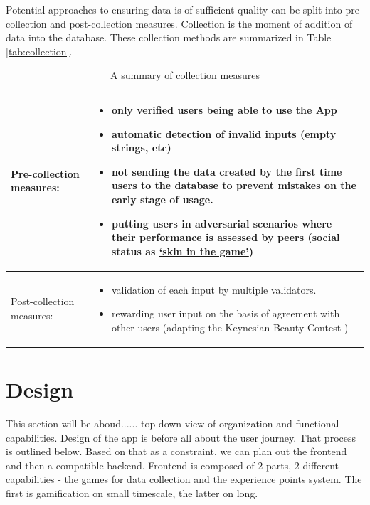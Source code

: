 \documentclass{report}
\begin{document}
Potential approaches to ensuring data is of sufficient quality can be split into pre-collection and post-collection measures. Collection is the moment of addition of data into the database. These collection methods are summarized in Table \ref{tab:collection}.

  \begin{table}[h!]
      \centering
    \begin{tabular}{|l|p{4cm}|}
\toprule
Pre-collection measures:  & \begin{itemize}[left=0pt,topsep=0pt]\item only verified users being able to use the App
  \item automatic detection of invalid inputs (empty strings, etc)
  \item not sending the data created by the first time users to the database to prevent mistakes on the early stage of usage.
  \item putting users in adversarial scenarios where their performance is assessed by peers (social status as \href{https://dictionary.cambridge.org/dictionary/english/have-skin-in-the-game}{`skin in the game'})
\end{itemize} \\
\midrule

 Post-collection measures:  & \begin{itemize}[left=0pt,topsep=0pt]
  \item validation of each input by multiple validators.  
  \item rewarding user input on the basis of agreement with other users (adapting the Keynesian Beauty Contest \cite{keynes_general_1935})

\end{itemize} \\
\bottomrule
    \end{tabular}
    \caption{A summary of collection measures}

 \end{table}\label{tab:collection}

\newpage

\chapter{Design}
This section will be aboud...... top down view of organization and functional capabilities.
Design of the app is before all about the user journey. That process is outlined below. Based on that as a constraint, we can plan out the frontend and then a compatible backend.
Frontend is composed of 2 parts, 2 different capabilities - the games for data collection and the experience points system. The first is gamification on small timescale, the latter on long.
\end{document}
